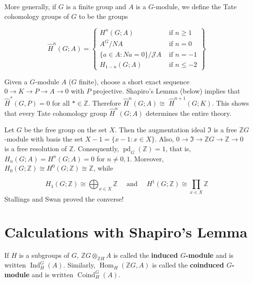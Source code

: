 More generally, if $G$ is a finite group and $A$ is a $G$-module, we define the Tate cohomology groups of $G$ to be the groups

$$
\hat{H}^n(G ; A)=\left\{\begin{array}{ll}
H^n(G ; A) & \text { if } n \geq 1 \\
A^G / N A & \text { if } n=0 \\
\{a \in A: N a=0\} / \mathcal{J} A & \text { if } n=-1 \\
H_{1-n}(G ; A) & \text { if } n \leq-2
\end{array}\right\}
$$

\begin{example}
 Given a $G$-module $A$ ($G$ finite), choose a short exact sequence $0 \rightarrow K \rightarrow P \rightarrow A \rightarrow 0$ with $P$ projective. Shapiro's Lemma (below) implies that $\hat{H}^*(G, P)=0$ for all $* \in \mathbb{Z}$. Therefore $\hat{H}^n(G ; A) \cong$ $\hat{H}^{n+1}(G ; K)$. This shows that every Tate cohomology group $\hat{H}^n(G ; A)$ determines the entire theory.    
\end{example}

\begin{prop}
Let $G$ be the free group on the set $X$. Then the augmentation ideal $\mathfrak{I}$ is a free $\mathbb{Z} G$-module with basis the set $X-1=\{x-1: x \in X\}$. Also, $0 \rightarrow \mathfrak{I} \rightarrow \mathbb{Z} G \rightarrow \mathbb{Z} \rightarrow 0$ is a free resolution of $\mathbb{Z}$. Consequently, $\operatorname{pd}_G(\mathbb{Z})=1$, that is, $H_n(G ; A)=H^n(G ; A)=0$ for $n \neq 0,1$. Moreover, $H_0(G ; \mathbb{Z}) \cong H^0(G ; \mathbb{Z}) \cong \mathbb{Z}$, while

$$
H_1(G ; \mathbb{Z}) \cong \bigoplus_{x \in X} \mathbb{Z} \quad \text { and } \quad H^1(G ; \mathbb{Z}) \cong \prod_{x \in X} \mathbb{Z}
$$
Stallings and Swan proved the converse!
\end{prop}

\section{Calculations with Shapiro's Lemma}

If $H$ is a subgroups of $G$, $\mathbb{Z} G \otimes_{\mathbb{Z} H} A$ is called the \textbf{induced $G$-module} and is written $\operatorname{Ind}_H^G(A)$. Similarly, $\operatorname{Hom}_H(\mathbb{Z} G, A)$ is called the \textbf{coinduced $G$-module} and is written $\operatorname{Coind}_H^G(A)$.

